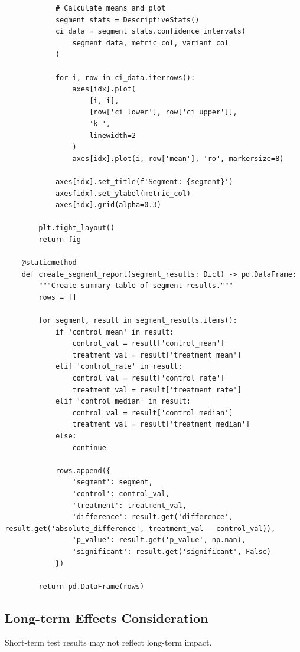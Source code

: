 \begin{lstlisting}
            # Calculate means and plot
            segment_stats = DescriptiveStats()
            ci_data = segment_stats.confidence_intervals(
                segment_data, metric_col, variant_col
            )

            for i, row in ci_data.iterrows():
                axes[idx].plot(
                    [i, i],
                    [row['ci_lower'], row['ci_upper']],
                    'k-',
                    linewidth=2
                )
                axes[idx].plot(i, row['mean'], 'ro', markersize=8)

            axes[idx].set_title(f'Segment: {segment}')
            axes[idx].set_ylabel(metric_col)
            axes[idx].grid(alpha=0.3)

        plt.tight_layout()
        return fig

    @staticmethod
    def create_segment_report(segment_results: Dict) -> pd.DataFrame:
        """Create summary table of segment results."""
        rows = []

        for segment, result in segment_results.items():
            if 'control_mean' in result:
                control_val = result['control_mean']
                treatment_val = result['treatment_mean']
            elif 'control_rate' in result:
                control_val = result['control_rate']
                treatment_val = result['treatment_rate']
            elif 'control_median' in result:
                control_val = result['control_median']
                treatment_val = result['treatment_median']
            else:
                continue

            rows.append({
                'segment': segment,
                'control': control_val,
                'treatment': treatment_val,
                'difference': result.get('difference',  result.get('absolute_difference', treatment_val - control_val)),
                'p_value': result.get('p_value', np.nan),
                'significant': result.get('significant', False)
            })

        return pd.DataFrame(rows)

\end{lstlisting}

\subsection{Long-term Effects Consideration}

Short-term test results may not reflect long-term impact.

